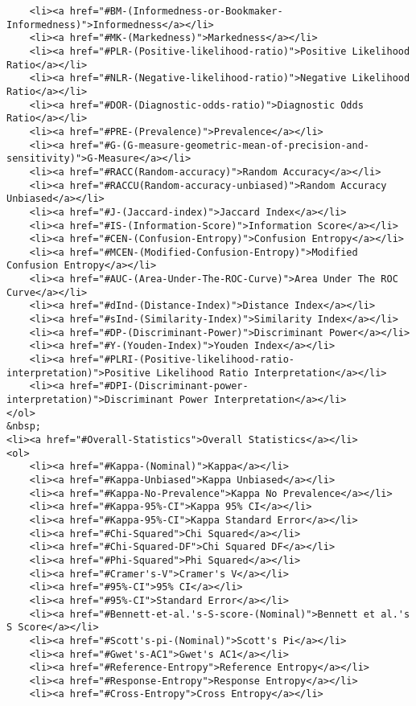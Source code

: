 \documentclass[11pt]{article}
\begin{document}
\begin{verbatim}
    <li><a href="#BM-(Informedness-or-Bookmaker-Informedness)">Informedness</a></li>
    <li><a href="#MK-(Markedness)">Markedness</a></li>
    <li><a href="#PLR-(Positive-likelihood-ratio)">Positive Likelihood Ratio</a></li>
    <li><a href="#NLR-(Negative-likelihood-ratio)">Negative Likelihood Ratio</a></li>
    <li><a href="#DOR-(Diagnostic-odds-ratio)">Diagnostic Odds Ratio</a></li>
    <li><a href="#PRE-(Prevalence)">Prevalence</a></li>
    <li><a href="#G-(G-measure-geometric-mean-of-precision-and-sensitivity)">G-Measure</a></li>
    <li><a href="#RACC(Random-accuracy)">Random Accuracy</a></li>
    <li><a href="#RACCU(Random-accuracy-unbiased)">Random Accuracy Unbiased</a></li>
    <li><a href="#J-(Jaccard-index)">Jaccard Index</a></li>
    <li><a href="#IS-(Information-Score)">Information Score</a></li>
    <li><a href="#CEN-(Confusion-Entropy)">Confusion Entropy</a></li>
    <li><a href="#MCEN-(Modified-Confusion-Entropy)">Modified Confusion Entropy</a></li>
    <li><a href="#AUC-(Area-Under-The-ROC-Curve)">Area Under The ROC Curve</a></li>
    <li><a href="#dInd-(Distance-Index)">Distance Index</a></li>
    <li><a href="#sInd-(Similarity-Index)">Similarity Index</a></li>
    <li><a href="#DP-(Discriminant-Power)">Discriminant Power</a></li>
    <li><a href="#Y-(Youden-Index)">Youden Index</a></li>
    <li><a href="#PLRI-(Positive-likelihood-ratio-interpretation)">Positive Likelihood Ratio Interpretation</a></li>
    <li><a href="#DPI-(Discriminant-power-interpretation)">Discriminant Power Interpretation</a></li>
</ol>
&nbsp;
<li><a href="#Overall-Statistics">Overall Statistics</a></li>
<ol>
    <li><a href="#Kappa-(Nominal)">Kappa</a></li>
    <li><a href="#Kappa-Unbiased">Kappa Unbiased</a></li>
    <li><a href="#Kappa-No-Prevalence">Kappa No Prevalence</a></li>
    <li><a href="#Kappa-95%-CI">Kappa 95% CI</a></li>
    <li><a href="#Kappa-95%-CI">Kappa Standard Error</a></li>
    <li><a href="#Chi-Squared">Chi Squared</a></li>
    <li><a href="#Chi-Squared-DF">Chi Squared DF</a></li>
    <li><a href="#Phi-Squared">Phi Squared</a></li>
    <li><a href="#Cramer's-V">Cramer's V</a></li>
    <li><a href="#95%-CI">95% CI</a></li>
    <li><a href="#95%-CI">Standard Error</a></li>
    <li><a href="#Bennett-et-al.'s-S-score-(Nominal)">Bennett et al.'s S Score</a></li>
    <li><a href="#Scott's-pi-(Nominal)">Scott's Pi</a></li>
    <li><a href="#Gwet's-AC1">Gwet's AC1</a></li>
    <li><a href="#Reference-Entropy">Reference Entropy</a></li>
    <li><a href="#Response-Entropy">Response Entropy</a></li>
    <li><a href="#Cross-Entropy">Cross Entropy</a></li>

\end{verbatim}
\end{document}
